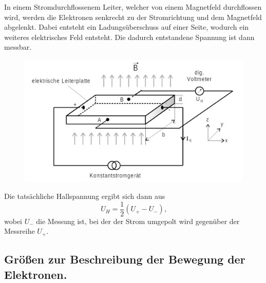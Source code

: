 \noindent In einem Stromdurchflossenem Leiter, welcher von einem Magnetfeld durchflossen wird, werden die Elektronen senkrecht
zu der Stromrichtung und dem Magnetfeld abgelenkt. Dabei entsteht ein Ladungsüberschuss auf einer Seite, wodurch 
ein weiteres elektrisches Feld entsteht. Die dadurch entstandene Spannung ist dann messbar.
\begin{figure}[H]
    \centering
    \includegraphics{Bilder/Halleffekt.png}
    \label{fig:Halleffekt}
\end{figure}

Die tatsächliche Hallspannung ergibt sich dann aus 
\begin{equation}
    U_H=\frac{1}{2}(U_+-U_-) \text{,}
    \label{eqn:stör}
\end{equation}
wobei $U_-$ die Messung ist, bei der der Strom umgepolt wird gegenüber der Messreihe $U_+$.

\subsection{Größen zur Beschreibung der Bewegung der Elektronen.}

